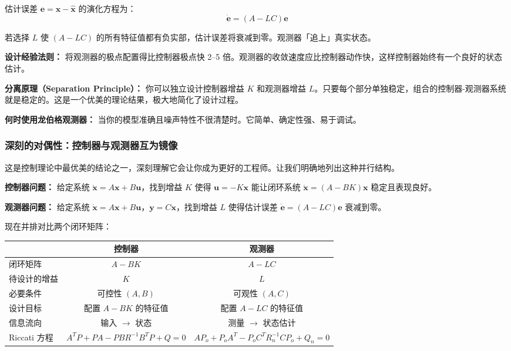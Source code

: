 估计误差 $\mathbf{e} = \mathbf{x} - \hat{\mathbf{x}}$ 的演化方程为：
\begin{equation}
\dot{\mathbf{e}} = (A - LC)\mathbf{e}
\end{equation}

若选择 $L$ 使 $(A - LC)$ 的所有特征值都有负实部，估计误差将衰减到零。观测器「追上」真实状态。

\textbf{设计经验法则：} 将观测器的极点配置得比控制器极点快 2--5 倍。观测器的收敛速度应比控制器动作快，这样控制器始终有一个良好的状态估计。

\textbf{分离原理（Separation Principle）：} 你可以独立设计控制器增益 $K$ 和观测器增益 $L$。只要每个部分单独稳定，组合的控制器-观测器系统就是稳定的。这是一个优美的理论结果，极大地简化了设计过程。

\textbf{何时使用龙伯格观测器：} 当你的模型准确且噪声特性不很清楚时。它简单、确定性强、易于调试。

\subsubsection{深刻的对偶性：控制器与观测器互为镜像}

这是控制理论中最优美的结论之一，深刻理解它会让你成为更好的工程师。让我们明确地列出这种并行结构。

\textbf{控制器问题：} 给定系统 $\dot{\mathbf{x}} = A\mathbf{x} + B\mathbf{u}$，找到增益 $K$ 使得 $\mathbf{u} = -K\mathbf{x}$ 能让闭环系统 $\dot{\mathbf{x}} = (A - BK)\mathbf{x}$ 稳定且表现良好。

\textbf{观测器问题：} 给定系统 $\dot{\mathbf{x}} = A\mathbf{x} + B\mathbf{u}$，$\mathbf{y} = C\mathbf{x}$，找到增益 $L$ 使得估计误差 $\dot{\mathbf{e}} = (A - LC)\mathbf{e}$ 衰减到零。

现在并排对比两个闭环矩阵：

\begin{center}
\begin{tabular}{lcc}
\toprule
 & \textbf{控制器} & \textbf{观测器} \\
\midrule
闭环矩阵 & $A - BK$ & $A - LC$ \\
待设计的增益 & $K$ & $L$ \\
必要条件 & 可控性 $(A, B)$ & 可观性 $(A, C)$ \\
设计目标 & 配置 $A - BK$ 的特征值 & 配置 $A - LC$ 的特征值 \\
信息流向 & 输入 $\to$ 状态 & 测量 $\to$ 状态估计 \\
Riccati 方程 & $A^TP + PA - PBR^{-1}B^TP + Q = 0$ & $AP_o + P_oA^T - P_oC^TR_n^{-1}CP_o + Q_n = 0$ \\
\bottomrule
\end{tabular}
\end{center}

